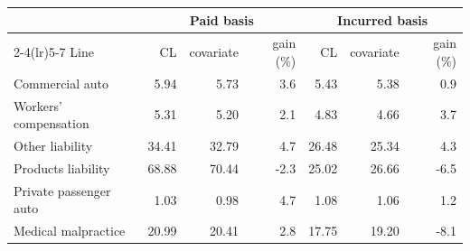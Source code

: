 \begin{tabular}{lrrrrrr}
\toprule
& \multicolumn{3}{c}{Paid basis} & \multicolumn{3}{c}{Incurred basis} \\
\cmidrule(lr){2-4}\cmidrule(lr){5-7}
Line & CL & covariate & gain (\%) & CL & covariate & gain (\%) \\
\midrule
Commercial auto & 5.94 & 5.73 & 3.6 & 5.43 & 5.38 & 0.9 \\
Workers' compensation & 5.31 & 5.20 & 2.1 & 4.83 & 4.66 & 3.7 \\
Other liability & 34.41 & 32.79 & 4.7 & 26.48 & 25.34 & 4.3 \\
Products liability & 68.88 & 70.44 & -2.3 & 25.02 & 26.66 & -6.5 \\
Private passenger auto & 1.03 & 0.98 & 4.7 & 1.08 & 1.06 & 1.2 \\
Medical malpractice & 20.99 & 20.41 & 2.8 & 17.75 & 19.20 & -8.1 \\
\bottomrule
\end{tabular}
